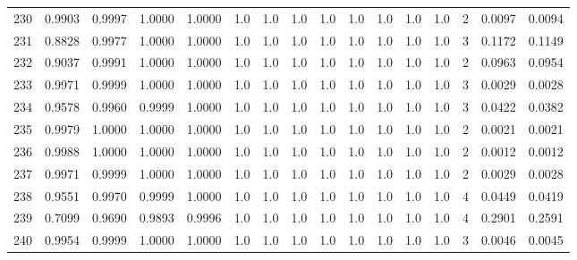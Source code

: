 \begin{tabular}{lrrrrrrrrrrrrrrr}
230 &      0.9903 &  0.9997 &  1.0000 &  1.0000 &     1.0 &     1.0 &     1.0 &     1.0 &     1.0 &     1.0 &      1.0 &        1.0 &      2 &                    0.0097 &                     0.0094 \\
231 &      0.8828 &  0.9977 &  1.0000 &  1.0000 &     1.0 &     1.0 &     1.0 &     1.0 &     1.0 &     1.0 &      1.0 &        1.0 &      3 &                    0.1172 &                     0.1149 \\
232 &      0.9037 &  0.9991 &  1.0000 &  1.0000 &     1.0 &     1.0 &     1.0 &     1.0 &     1.0 &     1.0 &      1.0 &        1.0 &      2 &                    0.0963 &                     0.0954 \\
233 &      0.9971 &  0.9999 &  1.0000 &  1.0000 &     1.0 &     1.0 &     1.0 &     1.0 &     1.0 &     1.0 &      1.0 &        1.0 &      3 &                    0.0029 &                     0.0028 \\
234 &      0.9578 &  0.9960 &  0.9999 &  1.0000 &     1.0 &     1.0 &     1.0 &     1.0 &     1.0 &     1.0 &      1.0 &        1.0 &      3 &                    0.0422 &                     0.0382 \\
235 &      0.9979 &  1.0000 &  1.0000 &  1.0000 &     1.0 &     1.0 &     1.0 &     1.0 &     1.0 &     1.0 &      1.0 &        1.0 &      2 &                    0.0021 &                     0.0021 \\
236 &      0.9988 &  1.0000 &  1.0000 &  1.0000 &     1.0 &     1.0 &     1.0 &     1.0 &     1.0 &     1.0 &      1.0 &        1.0 &      2 &                    0.0012 &                     0.0012 \\
237 &      0.9971 &  0.9999 &  1.0000 &  1.0000 &     1.0 &     1.0 &     1.0 &     1.0 &     1.0 &     1.0 &      1.0 &        1.0 &      2 &                    0.0029 &                     0.0028 \\
238 &      0.9551 &  0.9970 &  0.9999 &  1.0000 &     1.0 &     1.0 &     1.0 &     1.0 &     1.0 &     1.0 &      1.0 &        1.0 &      4 &                    0.0449 &                     0.0419 \\
239 &      0.7099 &  0.9690 &  0.9893 &  0.9996 &     1.0 &     1.0 &     1.0 &     1.0 &     1.0 &     1.0 &      1.0 &        1.0 &      4 &                    0.2901 &                     0.2591 \\
240 &      0.9954 &  0.9999 &  1.0000 &  1.0000 &     1.0 &     1.0 &     1.0 &     1.0 &     1.0 &     1.0 &      1.0 &        1.0 &      3 &                    0.0046 &                     0.0045 \\

\end{tabular}
